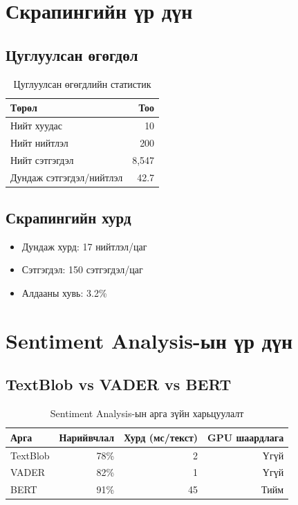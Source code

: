 \documentclass[12pt,a4paper]{report}
\begin{document}
\section{Скрапингийн үр дүн}

\subsection{Цуглуулсан өгөгдөл}

\begin{table}[H]
\centering
\caption{Цуглуулсан өгөгдлийн статистик}
\begin{tabular}{|l|r|}
\hline
\textbf{Төрөл} & \textbf{Тоо} \\
\hline
Нийт хуудас & 10 \\
Нийт нийтлэл & 200 \\
Нийт сэтгэгдэл & 8,547 \\
Дундаж сэтгэгдэл/нийтлэл & 42.7 \\
\hline
\end{tabular}
\end{table}

\subsection{Скрапингийн хурд}

\begin{itemize}
    \item Дундаж хурд: 17 нийтлэл/цаг
    \item Сэтгэгдэл: 150 сэтгэгдэл/цаг
    \item Алдааны хувь: 3.2\%
\end{itemize}

\section{Sentiment Analysis-ын үр дүн}

\subsection{TextBlob vs VADER vs BERT}

\begin{table}[H]
\centering
\caption{Sentiment Analysis-ын арга зүйн харьцуулалт}
\begin{tabular}{|l|r|r|r|}
\hline
\textbf{Арга} & \textbf{Нарийвчлал} & \textbf{Хурд (мс/текст)} & \textbf{GPU шаардлага} \\
\hline
TextBlob & 78\% & 2 & Үгүй \\
VADER & 82\% & 1 & Үгүй \\
BERT & 91\% & 45 & Тийм \\
\hline
\end{tabular}
\end{table}
\end{document}
